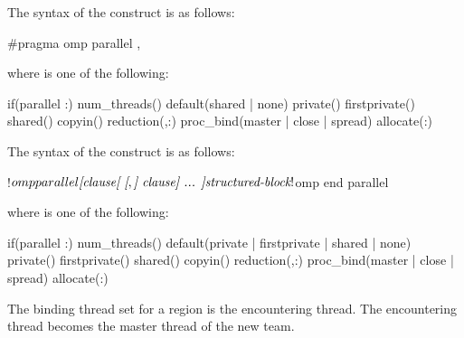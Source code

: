 \syntax
\begin{ccppspecific}
The syntax of the  construct is as follows:
\begin{ompcPragma}
#pragma omp parallel \plc{[clause[ [},\plc{] clause] ... ] new-line}
\end{ompcPragma}

where  is one of the following:

{}
\begin{indentedcodelist}
if(\plc{[}parallel :\plc{] scalar-expression})
num_threads()
default(shared \textnormal{|} none)
private()
firstprivate()
shared()
copyin()
reduction(\plc{[ reduction-modifier},\plc{] reduction-identifier }:)
proc_bind(master \textnormal{|} close \textnormal{|} spread)
allocate(\plc{[allocator }:\plc{] list})
\end{indentedcodelist}
\end{ccppspecific}

\begin{fortranspecific}
The syntax of the  construct is as follows:

\begin{ompfPragma}
!$omp parallel \plc{[clause[ [},\plc{] clause] ... ]}
   \plc{structured-block}
!$omp end parallel
\end{ompfPragma}

\begin{samepage}
where  is one of the following:

{}
\begin{indentedcodelist}
if(\plc{[}parallel :\plc{] scalar-logical-expression})
num_threads()
default(private \textnormal{|} firstprivate \textnormal{|} shared \textnormal{|} none)
private()
firstprivate()
shared()
copyin()
reduction(\plc{[ reduction-modifier},\plc{] reduction-identifier }:)
proc_bind(master \textnormal{|} close \textnormal{|} spread)
allocate(\plc{[allocator }:\plc{] list})
\end{indentedcodelist}
\end{samepage}

\end{fortranspecific}

\binding
The binding thread set for a  region is the encountering thread. The
encountering thread becomes the master thread of the new team.

